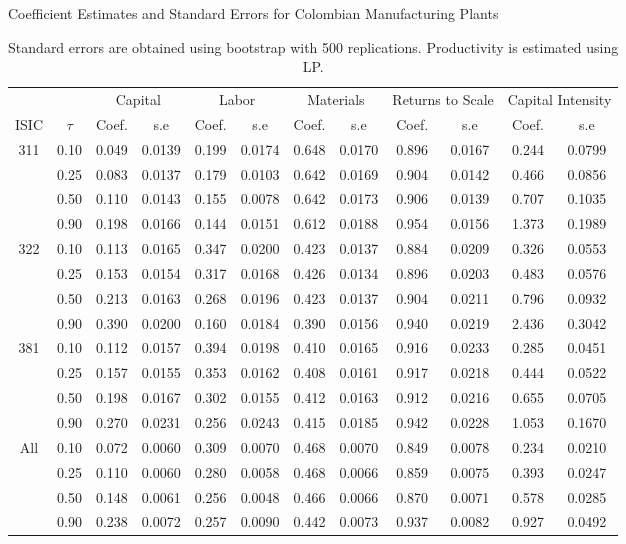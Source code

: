 \documentclass[11pt]{article}
\begin{document}
\begin{table}[H]
\centering
\caption{Coefficient Estimates and Standard Errors for Colombian Manufacturing Plants}
\begin{tabular}{cccccccccccc}
  \hline\hline & & \multicolumn{2}{c}{Capital}  & \multicolumn{2}{c}{Labor} & \multicolumn{2}{c}{Materials} & \multicolumn{2}{c}{Returns to Scale} & \multicolumn{2}{c}{Capital Intensity}\\ \cmidrule(lr){3-4} \cmidrule(lr){5-6} \cmidrule(lr){7-8} \cmidrule(lr){9-10} \cmidrule(lr){11-12}ISIC & $\tau$ & Coef. & s.e & Coef. & s.e & Coef. & s.e & Coef. & s.e & Coef. & s.e \\ 
  \hline
311 & 0.10 & 0.049 & 0.0139 & 0.199 & 0.0174 & 0.648 & 0.0170 & 0.896 & 0.0167 & 0.244 & 0.0799 \\ 
   & 0.25 & 0.083 & 0.0137 & 0.179 & 0.0103 & 0.642 & 0.0169 & 0.904 & 0.0142 & 0.466 & 0.0856 \\ 
   & 0.50 & 0.110 & 0.0143 & 0.155 & 0.0078 & 0.642 & 0.0173 & 0.906 & 0.0139 & 0.707 & 0.1035 \\ 
   & 0.90 & 0.198 & 0.0166 & 0.144 & 0.0151 & 0.612 & 0.0188 & 0.954 & 0.0156 & 1.373 & 0.1989 \\ 
  322 & 0.10 & 0.113 & 0.0165 & 0.347 & 0.0200 & 0.423 & 0.0137 & 0.884 & 0.0209 & 0.326 & 0.0553 \\ 
   & 0.25 & 0.153 & 0.0154 & 0.317 & 0.0168 & 0.426 & 0.0134 & 0.896 & 0.0203 & 0.483 & 0.0576 \\ 
   & 0.50 & 0.213 & 0.0163 & 0.268 & 0.0196 & 0.423 & 0.0137 & 0.904 & 0.0211 & 0.796 & 0.0932 \\ 
   & 0.90 & 0.390 & 0.0200 & 0.160 & 0.0184 & 0.390 & 0.0156 & 0.940 & 0.0219 & 2.436 & 0.3042 \\ 
  381 & 0.10 & 0.112 & 0.0157 & 0.394 & 0.0198 & 0.410 & 0.0165 & 0.916 & 0.0233 & 0.285 & 0.0451 \\ 
   & 0.25 & 0.157 & 0.0155 & 0.353 & 0.0162 & 0.408 & 0.0161 & 0.917 & 0.0218 & 0.444 & 0.0522 \\ 
   & 0.50 & 0.198 & 0.0167 & 0.302 & 0.0155 & 0.412 & 0.0163 & 0.912 & 0.0216 & 0.655 & 0.0705 \\ 
   & 0.90 & 0.270 & 0.0231 & 0.256 & 0.0243 & 0.415 & 0.0185 & 0.942 & 0.0228 & 1.053 & 0.1670 \\ 
  All & 0.10 & 0.072 & 0.0060 & 0.309 & 0.0070 & 0.468 & 0.0070 & 0.849 & 0.0078 & 0.234 & 0.0210 \\ 
   & 0.25 & 0.110 & 0.0060 & 0.280 & 0.0058 & 0.468 & 0.0066 & 0.859 & 0.0075 & 0.393 & 0.0247 \\ 
   & 0.50 & 0.148 & 0.0061 & 0.256 & 0.0048 & 0.466 & 0.0066 & 0.870 & 0.0071 & 0.578 & 0.0285 \\ 
   & 0.90 & 0.238 & 0.0072 & 0.257 & 0.0090 & 0.442 & 0.0073 & 0.937 & 0.0082 & 0.927 & 0.0492 \\ 
   \hline
\end{tabular}
\caption*{\footnotesize Standard errors are obtained using bootstrap with 500 replications. Productivity is estimated using LP.}
\label{COLestLP}
\end{table}
\end{document}

